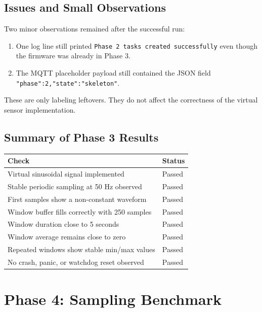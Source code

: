 \documentclass[12pt,a4paper]{article}
\begin{document}
\subsection{Issues and Small Observations}

Two minor observations remained after the successful run:

\begin{enumerate}[label=\arabic*.]
    \item One log line still printed \texttt{Phase 2 tasks created successfully}
    even though the firmware was already in Phase 3.
    \item The MQTT placeholder payload still contained the JSON field
    \texttt{"phase":2,"state":"skeleton"}.
\end{enumerate}

These are only labeling leftovers. They do not affect the correctness of the
virtual sensor implementation.

\subsection{Summary of Phase 3 Results}

\begin{longtable}{|>{\raggedright\arraybackslash}p{}|>{\raggedright\arraybackslash}p{}|}
\hline
\textbf{Check} & \textbf{Status} \\
\hline
Virtual sinusoidal signal implemented & Passed \\
\hline
Stable periodic sampling at 50 Hz observed & Passed \\
\hline
First samples show a non-constant waveform & Passed \\
\hline
Window buffer fills correctly with 250 samples & Passed \\
\hline
Window duration close to 5 seconds & Passed \\
\hline
Window average remains close to zero & Passed \\
\hline
Repeated windows show stable min/max values & Passed \\
\hline
No crash, panic, or watchdog reset observed & Passed \\
\hline
\end{longtable}

\section{Phase 4: Sampling Benchmark}
\end{document}
